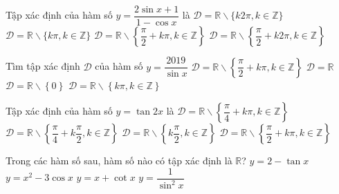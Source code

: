 \begin{ex}%
	Tập xác định của hàm số $y=\dfrac{2\sin  x+1}{1-\cos x}$ là
	 \choice
		{\True $\mathscr{D} = \mathbb{R}\backslash\{k2\pi, k\in \mathbb{Z}\}  $}
		{$\mathscr{D}  = \mathbb{R}\backslash\{ k\pi, k\in \mathbb{Z} \} $}
		 {$\mathscr{D} = \mathbb{R}\backslash\left\{ \dfrac{\pi }{2}+k\pi, k\in \mathbb{Z} \right\} $}
		{$\mathscr{D} = \mathbb{R}\backslash\left\{ \dfrac{\pi }{2}+k2\pi,  k\in \mathbb{Z} \right\} $}
\end{ex}

\begin{ex}%
	Tìm tập xác định $\mathscr{D}$ của hàm  số $y=\dfrac{2019}{\sin x}$
	 \choice
		{$\mathscr{D}=\mathbb{R}\backslash \left\{ \dfrac{\pi  }{2}+k\pi ,k\in \mathbb{Z} \right\}$}
		{$\mathscr{D}=\mathbb{R}$} 
		{$\mathscr{D}=\mathbb{R}\backslash  \left\{ 0 \right\}$ }
		{\True $\mathscr{D}=\mathbb{R}\backslash \left\{  k\pi ,k\in \mathbb{Z} \right\}$}
\end{ex}

\begin{ex}%
	Tập xác định của hàm số \( y = \tan 2x \) là 
	 \choice
		{\( \mathscr{D} =  \mathbb{R}\backslash \left\{ \dfrac{\pi }{4}+k\pi ,k\in \mathbb{Z} \right\} \)}
		{\True \( \mathscr{D} = \mathbb{R}\backslash \left\{ \dfrac{\pi }{4}+k\dfrac{\pi }{2},k\in  \mathbb{Z} \right\} \)}
		{\( \mathscr{D} = \mathbb{R}\backslash  \left\{ k\dfrac{\pi }{2},k\in \mathbb{Z} \right\} \)}
		{\( \mathscr{D} = \mathbb{R}\backslash \left\{ \dfrac{\pi }{2}+k\pi ,k\in  \mathbb{Z} \right\} \)}
\end{ex}

\begin{ex}%
	Trong các hàm số sau,  hàm số nào có tập xác định là $\mathbb{R}$?
	\choice 
		 {$y=2-\tan x$}
		{\True $y=x^2-3\cos x$} 
		 {$y=x+\cot x$}
		{$y=\dfrac{1}{\sin^2x}$} 
\end{ex}

